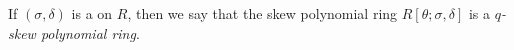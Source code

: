 \documentclass[12pt]{article}
\begin{document}
If $(\sigma, \delta)$ is a  on $R$, 
then we say that the skew polynomial ring $R[\theta;\sigma,\delta]$ 
is a {\it $q$-skew polynomial ring}.
\end{document}
